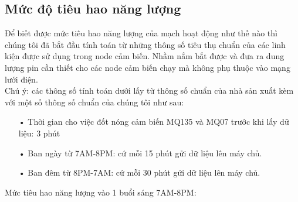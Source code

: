 \subsubsection*{}






\newpage
\subsection{Mức độ tiêu hao năng lượng}
Để biết được mức tiêu hao năng lượng của mạch hoạt động như thế nào thì chúng tôi đã bắt đầu tính toán từ những thông số tiêu thụ chuẩn của các linh kiện được sử dụng trong node cảm biến. Nhầm nắm bắt được và đưa ra dung lượng pin cần thiết cho các node cảm biến chạy mà không phụ thuộc vào mạng lưới điện.\\
Chú ý: các thông số tính toán dưới lấy từ thông số chuẩn của nhà sản xuất kèm với một số thông số chuẩn của chúng tôi như sau:
\begin{itemize}
\item[•] Thời gian cho việc đốt nóng cảm biến MQ135 và MQ07 trước khi lấy dữ liệu: 3 phút
\item[•] Ban ngày từ 7AM-8PM: cứ mỗi 15 phút gửi dữ liệu lên máy chủ.
\item[•] Ban đêm từ 8PM-7AM: cứ mỗi 30 phút gửi dữ liệu lên máy chủ.
\end{itemize}

Mức tiêu hao năng lượng vào 1 buổi sáng 7AM-8PM:

